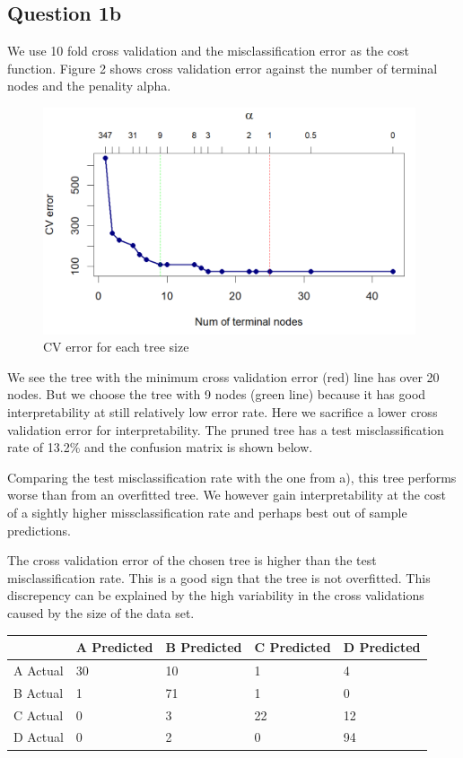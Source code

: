 \documentclass[
]{article}
\begin{document}
\hypertarget{question-1b}{%
\subsection{Question 1b}\label{question-1b}}

We use 10 fold cross validation and the misclassification error as the
cost function. Figure 2 shows cross validation error against the number
of terminal nodes and the penality alpha.

\begin{figure}
\centering
\includegraphics[width=4.32292in,height=\textheight]{cv_error_num_nones_mealies.png}
\caption{CV error for each tree size}
\end{figure}

We see the tree with the minimum cross validation error (red) line has
over 20 nodes. But we choose the tree with 9 nodes (green line) because
it has good interpretability at still relatively low error rate. Here we
sacrifice a lower cross validation error for interpretability. The
pruned tree has a test misclassification rate of 13.2\% and the
confusion matrix is shown below.

Comparing the test misclassification rate with the one from a), this
tree performs worse than from an overfitted tree. We however gain
interpretability at the cost of a sightly higher missclassification rate
and perhaps best out of sample predictions.

The cross validation error of the chosen tree is higher than the test
misclassification rate. This is a good sign that the tree is not
overfitted. This discrepency can be explained by the high variability in
the cross validations caused by the size of the data set.

\begin{longtable}[]{@{}lllll@{}}
\toprule\noalign{}
& A Predicted & B Predicted & C Predicted & D Predicted \\
\midrule\noalign{}
\endhead
\bottomrule\noalign{}
\endlastfoot
A Actual & 30 & 10 & 1 & 4 \\
B Actual & 1 & 71 & 1 & 0 \\
C Actual & 0 & 3 & 22 & 12 \\
D Actual & 0 & 2 & 0 & 94 \\
\end{longtable}
\end{document}
